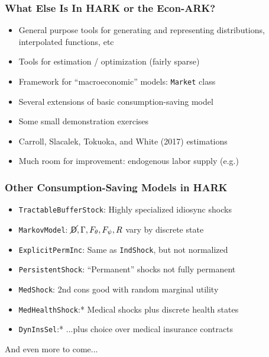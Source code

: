\documentclass[11ptt]{beamer}
\newcommand{\Die}{\mathsf{D}}
\newcommand{\Live}{\cancel{\Die}}
\begin{document}
\begin{frame}
\frametitle{What Else Is In HARK or the Econ-ARK?}

\begin{itemize}
\item <1->General purpose tools for generating and representing distributions, interpolated functions, etc

\item <1->Tools for estimation / optimization (fairly sparse)

\item <2->Framework for ``macroeconomic'' models: \texttt{Market} class

\item <3->Several extensions of basic consumption-saving model

\item <4->Some small demonstration exercises

\item <4->Carroll, Slacalek, Tokuoka, and White (2017) estimations

\item <5->Much room for improvement: endogenous labor supply (e.g.)

\end{itemize}

\end{frame}



\begin{frame}
\frametitle{Other Consumption-Saving Models in HARK}
\begin{itemize}
\item <1->\texttt{TractableBufferStock}: Highly specialized idiosync shocks

\item <2->\texttt{MarkovModel}: $\Live,\Gamma,F_\theta,F_\psi,R$ vary by discrete state

\item <3->\texttt{ExplicitPermInc}: Same as \texttt{IndShock}, but not normalized

\item <3->\texttt{PersistentShock}: ``Permanent'' shocks not fully permanent

\item <4->\texttt{MedShock}: 2nd cons good with random marginal utility

\item <5->\texttt{MedHealthShock}:* Medical shocks plus discrete health states

\item <5->\texttt{DynInsSel}:* ...plus choice over medical insurance contracts
\end{itemize}
And even more to come...
\end{frame}
\end{document}
